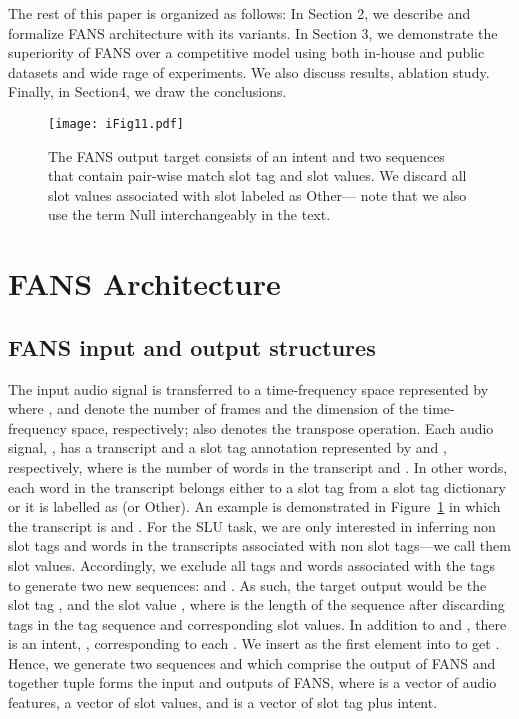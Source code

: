 \documentclass[a4paper]{article}
\begin{document}
 The rest of this paper is organized as follows:   In Section 2,  we describe and formalize FANS architecture with its variants. In Section 3,  we demonstrate the superiority of FANS over a competitive model using both in-house and public datasets and wide rage of experiments. We also discuss results, ablation study. Finally, in Section4, we draw the conclusions. 

\fi

\begin{figure}[h]
  \centering
  \texttt{[image: iFig11.pdf]}
    \caption{ The FANS output target consists of an intent  and two sequences that contain pair-wise match slot tag and slot values. We discard all slot values associated with slot labeled as Other--- note that we also use the term Null interchangeably in the text.}
  \label{fig:lossfunction}
\end{figure}




  
\section{FANS Architecture}
\subsection{FANS input and output structures}
The input audio signal is transferred to a time-frequency  space represented by    where  ,  and  denote the number of frames and the dimension of the time-frequency space, respectively;  also  denotes the transpose operation. Each audio signal, , has a transcript and a slot tag annotation represented by   and  , respectively, where  is the number of words in the transcript and
 . In other words, each word in the transcript belongs either to a slot tag from a slot tag dictionary or it is labelled as  (or Other). An example is demonstrated in Figure~\ref{fig:lossfunction} in which the transcript is  and . For the SLU task, we are only interested in inferring non  slot tags and words in the transcripts associated with non  slot tags---we call them slot values.  Accordingly, we exclude all  tags and words associated with the  tags to generate two new sequences:  and . As such, the target output would be  the slot tag , and the slot value , where  is the length of the sequence after discarding  tags in the tag sequence and corresponding slot values. In addition to  and , there is an intent, , corresponding  to each . We insert  as the first element into  to get  .  Hence, we generate two sequences  and  which comprise the output of FANS and  together tuple  forms the input and outputs of FANS, where  is a vector of audio features,  a vector of slot values, and  is a vector of slot tag plus intent. 
 
\end{document}
